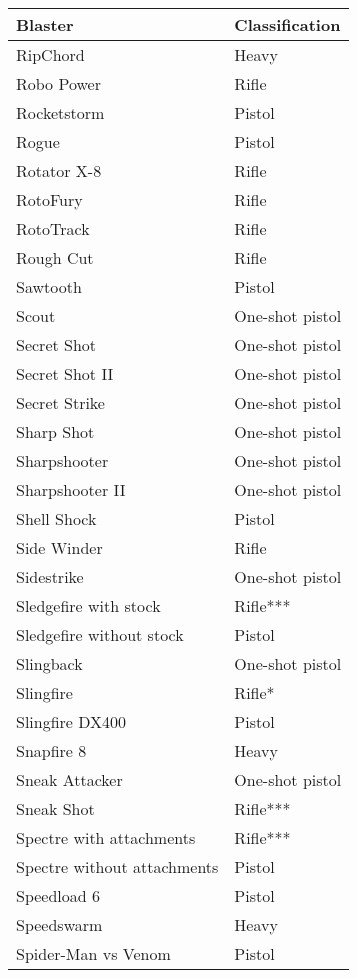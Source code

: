 \documentclass{scrbook}
\begin{document}
\begin{table}
\begin{tabular}{|l|l|} \hline 
Blaster & Classification \\
 \hline RipChord & Heavy \\
 \hline Robo Power & Rifle \\
 \hline Rocketstorm & Pistol \\
 \hline Rogue & Pistol \\
 \hline Rotator X-8 & Rifle \\
 \hline RotoFury & Rifle \\
 \hline RotoTrack & Rifle \\
 \hline Rough Cut & Rifle \\
 \hline Sawtooth & Pistol \\
 \hline Scout & One-shot pistol \\
 \hline Secret Shot & One-shot pistol \\
 \hline Secret Shot II & One-shot pistol \\
 \hline Secret Strike & One-shot pistol \\
 \hline Sharp Shot & One-shot pistol \\
 \hline Sharpshooter & One-shot pistol \\
 \hline Sharpshooter II & One-shot pistol \\
 \hline Shell Shock & Pistol \\
 \hline Side Winder & Rifle \\
 \hline Sidestrike & One-shot pistol \\
 \hline Sledgefire with stock & Rifle*** \\
 \hline Sledgefire without stock & Pistol \\
 \hline Slingback & One-shot pistol \\
 \hline Slingfire & Rifle* \\
 \hline Slingfire DX400 & Pistol \\
 \hline Snapfire 8 & Heavy \\
 \hline Sneak Attacker & One-shot pistol \\
 \hline Sneak Shot & Rifle*** \\
 \hline Spectre with attachments & Rifle*** \\
 \hline Spectre without attachments & Pistol \\
 \hline Speedload 6 & Pistol \\
 \hline Speedswarm & Heavy \\
 \hline Spider-Man vs Venom & Pistol \\

\end{tabular}
\end{table}
\end{document}

